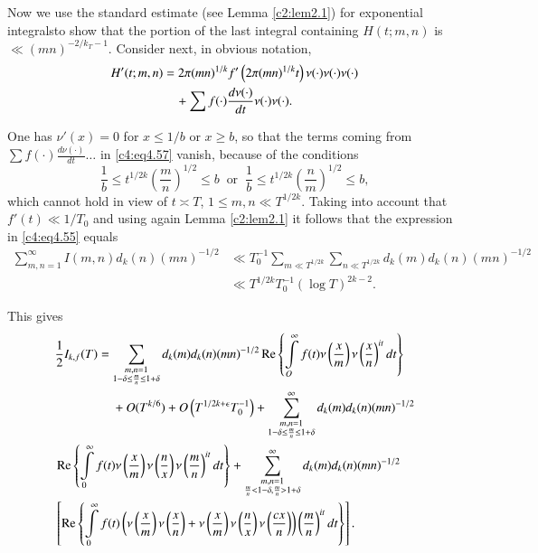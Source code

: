 Now we use the standard estimate (see Lemma \ref{c2:lem2.1}) for
exponential integrals\pageoriginale to show that the portion of the
last integral containing $H(t; m, n)$ is $\ll
(mn)^{-2/k_T-1}$. Consider next, in obvious notation,
\begin{align}
H' (t; m, n) &= 2 \pi (mn)^{1/k}f' \left(2\pi (mn)^{1/k}t\right)
  \nu(\cdot) \nu (\cdot) \nu (\cdot)\notag\\
&\quad + \sum f(\cdot) \frac{d \nu
    (\cdot)}{dt} \nu (\cdot) \nu (\cdot).  \label{c4:eq4.57} 
\end{align}

One has $\nu'(x) =0$ for $x \leq 1/b$ or $x \geq b$, so that the terms
coming from $\sum f(\cdot) \frac{d \nu (\cdot)}{dt} \ldots $ in
\eqref{c4:eq4.57} vanish, because of the conditions 
$$
\frac{1}{b} \leq t^{1/2k} \left(\frac{m}{n} \right)^{1/2} \leq b
~\text{ or }~ \frac{1}{b} \leq t^{1/2k} \left(\frac{n}{m} \right)^{1/2}
\leq b,
$$ 
which cannot hold in view of $t \asymp T$, $1 \leq m, n \ll
T^{1/2k}$. Taking into account that $f' (t) \ll 1/T_0$ and using again
Lemma \eqref{c2:lem2.1} it follows that the expression in
\eqref{c4:eq4.55} equals
\begin{align*}
  \sum_{m, n=1}^{\infty} I(m, n) d_k (n) (mn)^{-1/2} & \ll T_0^{-1}
  \sum_{m \ll T^{1/2k}} \sum_{n \ll T^{1/2k}} d_k (m) d_k (n)
  (mn)^{-1/2}\\
  & \ll T^{1/2k} T_0^{-1} (\log T)^{2k -2}.
\end{align*}

This gives 
\begin{align}
&  \frac{1}{2} I_{k, f}(T)   = \sum_{\substack{m, n=1\\1-\delta \leq
      \frac{m}{n} \leq 1+ \delta}} d_k (m) d_k (n) (mn)^{-1/2} \operatorname{Re}
  \left\{\int\limits_O^\infty f(t) \nu \left( \frac{x}{m}\right) \nu
    \left(\frac{x}{n} \right)^{it}dt\right\}\label{c4:eq4.58} \\
&\hspace{1.6cm}    + O(T^{k/6})+ O\left(T^{1/2 k+\epsilon} T_0^{-1}\right) +
    \sum\limits^\infty_{\substack{m, n = 1 \\ 1- \delta \leq \frac{m}{n} \leq 1 +
        \delta}} d_k (m) d_k (n) (mn)^{-1/2}\notag\\
&     \operatorname{Re} \left\{\int\limits_0^\infty f(t) \nu \left(\frac{x}{m}
    \right) \nu \left(\frac{n}{x} \right)\nu \left(
    \frac{m}{n}\right)^{it} dt\right\} + \sum\limits^\infty_{\substack{m,
        n=1\\\frac{m}{n} < 1- \delta, \frac{m}{n} > 1+ \delta}} d_k
    (m) d_k (n) (mn)^{-1/2}\notag\\
&    \left[ \operatorname{Re} \left\{\int\limits_0^\infty f(t) \left(\nu
      \left(\frac{x}{m} \right) \nu \left(\frac{x}{n} \right)+ \nu
      \left(\frac{x}{m} \right) \nu \left(\frac{n}{x} \right)\nu
      \left(\frac{cx}{n} \right)\right) \left(\frac{m}{n}
      \right)^{it} dt \right\}\right]. \notag
\end{align}

